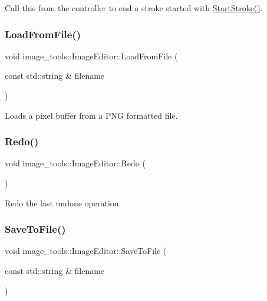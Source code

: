 Call this from the controller to end a stroke started with \hyperlink{classimage__tools_1_1ImageEditor_a396d6b86c6d740714f4311737a40e19c}{Start\+Stroke()}. \mbox{\label{classimage__tools_1_1ImageEditor_a2eadb26d997e0a8b03c30b6181215b87}} 
\subsubsection{\texorpdfstring{Load\+From\+File()}{LoadFromFile()}}
{\footnotesize\ttfamily void image\+\_\+tools\+::\+Image\+Editor\+::\+Load\+From\+File (\begin{DoxyParamCaption}\item[{const std\+::string \&}]{filename }\end{DoxyParamCaption})}

Loads a pixel buffer from a P\+NG formatted file. \mbox{\label{classimage__tools_1_1ImageEditor_adc595320db962da732b9fb8c752d5286}} 
\subsubsection{\texorpdfstring{Redo()}{Redo()}}
{\footnotesize\ttfamily void image\+\_\+tools\+::\+Image\+Editor\+::\+Redo (\begin{DoxyParamCaption}{ }\end{DoxyParamCaption})}

Redo the last undone operation. \mbox{\label{classimage__tools_1_1ImageEditor_a9a99dba9070acc0cfe40b33e052a497e}} 
\subsubsection{\texorpdfstring{Save\+To\+File()}{SaveToFile()}}
{\footnotesize\ttfamily void image\+\_\+tools\+::\+Image\+Editor\+::\+Save\+To\+File (\begin{DoxyParamCaption}\item[{const std\+::string \&}]{filename }\end{DoxyParamCaption})}

